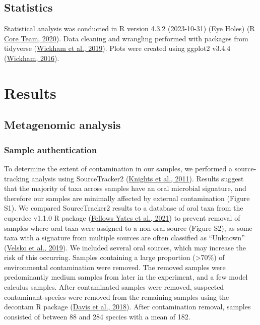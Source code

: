 \documentclass[
  b5paper,
]{book}
\begin{document}
\hypertarget{statistics}{%
\subsection{Statistics}\label{statistics}}

Statistical analysis was conducted in R version 4.3.2 (2023-10-31) (Eye
Holes) (\protect\hyperlink{ref-Rbase}{R Core Team, 2020}). Data cleaning
and wrangling performed with packages from tidyverse
(\protect\hyperlink{ref-tidyverse2019}{Wickham et al., 2019}). Plots
were created using ggplot2 v3.4.4
(\protect\hyperlink{ref-ggplot2}{Wickham, 2016}).

\hypertarget{results}{%
\section{Results}\label{results}}

\hypertarget{metagenomic-analysis}{%
\subsection{Metagenomic analysis}\label{metagenomic-analysis}}

\hypertarget{sample-authentication}{%
\subsubsection{Sample authentication}\label{sample-authentication}}

To determine the extent of contamination in our samples, we performed a
source-tracking analysis using SourceTracker2
(\protect\hyperlink{ref-knightsSourceTracker2011}{Knights et al.,
2011}). Results suggest that the majority of taxa across samples have an
oral microbial signature, and therefore our samples are minimally
affected by external contamination (Figure S1). We compared
SourceTracker2 results to a database of oral taxa from the cuperdec
v1.1.0 R package
(\protect\hyperlink{ref-yatesOralMicrobiome2021}{Fellows Yates et al.,
2021}) to prevent removal of samples where oral taxa were assigned to a
non-oral source (Figure S2), as some taxa with a signature from multiple
sources are often classified as ``Unknown''
(\protect\hyperlink{ref-velskoMicrobialDifferences2019}{Velsko et al.,
2019}). We included several oral sources, which may increase the risk of
this occurring. Samples containing a large proportion (\textgreater70\%)
of environmental contamination were removed. The removed samples were
predominantly medium samples from later in the experiment, and a few
model calculus samples. After contaminated samples were removed,
suspected contaminant-species were removed from the remaining samples
using the decontam R package (\protect\hyperlink{ref-Rdecontam}{Davis et
al., 2018}). After contamination removal, samples consisted of between
88 and 284 species with a mean of 182.
\end{document}
